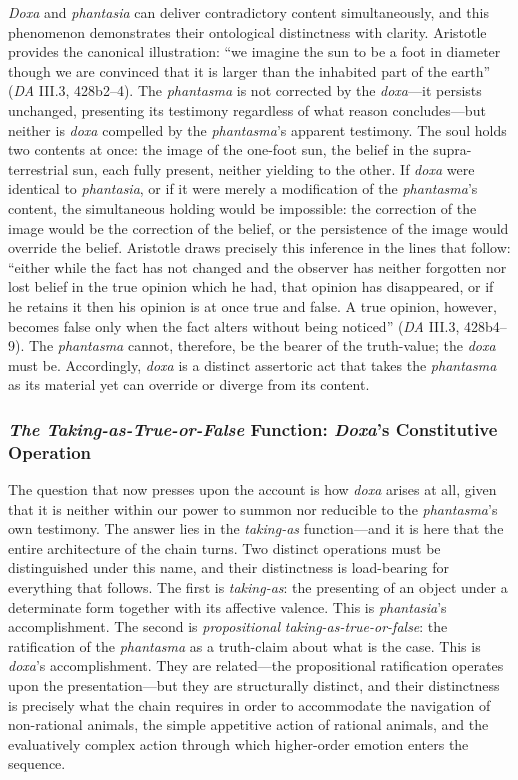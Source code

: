 \documentclass{article}
\begin{document}
\textit{Doxa} and \textit{phantasia} can deliver contradictory content simultaneously, and this phenomenon demonstrates their ontological distinctness with clarity. Aristotle provides the canonical illustration: ``we imagine the sun to be a foot in diameter though we are convinced that it is larger than the inhabited part of the earth'' (\textit{DA} III.3, 428b2--4). The \textit{phantasma} is not corrected by the \textit{doxa}---it persists unchanged, presenting its testimony regardless of what reason concludes---but neither is \textit{doxa} compelled by the \textit{phantasma}'s apparent testimony. The soul holds two contents at once: the image of the one-foot sun, the belief in the supra-terrestrial sun, each fully present, neither yielding to the other. If \textit{doxa} were identical to \textit{phantasia}, or if it were merely a modification of the \textit{phantasma}'s content, the simultaneous holding would be impossible: the correction of the image would be the correction of the belief, or the persistence of the image would override the belief. Aristotle draws precisely this inference in the lines that follow: ``either while the fact has not changed and the observer has neither forgotten nor lost belief in the true opinion which he had, that opinion has disappeared, or if he retains it then his opinion is at once true and false. A true opinion, however, becomes false only when the fact alters without being noticed'' (\textit{DA} III.3, 428b4--9). The \textit{phantasma} cannot, therefore, be the bearer of the truth-value; the \textit{doxa} must be. Accordingly, \textit{doxa} is a distinct assertoric act that takes the \textit{phantasma} as its material yet can override or diverge from its content.

\subsubsection*{\textit{The Taking-as-True-or-False} Function: \textit{Doxa}'s Constitutive Operation}

The question that now presses upon the account is how \textit{doxa} arises at all, given that it is neither within our power to summon nor reducible to the \textit{phantasma}'s own testimony. The answer lies in the \textit{taking-as} function---and it is here that the entire architecture of the chain turns. Two distinct operations must be distinguished under this name, and their distinctness is load-bearing for everything that follows. The first is \textit{taking-as}: the presenting of an object under a determinate form together with its affective valence. This is \textit{phantasia}'s accomplishment. The second is \textit{propositional} \textit{taking-as-true-or-false}: the ratification of the \textit{phantasma} as a truth-claim about what is the case. This is \textit{doxa}'s accomplishment. They are related---the propositional ratification operates upon the presentation---but they are structurally distinct, and their distinctness is precisely what the chain requires in order to accommodate the navigation of non-rational animals, the simple appetitive action of rational animals, and the evaluatively complex action through which higher-order emotion enters the sequence.
\end{document}
